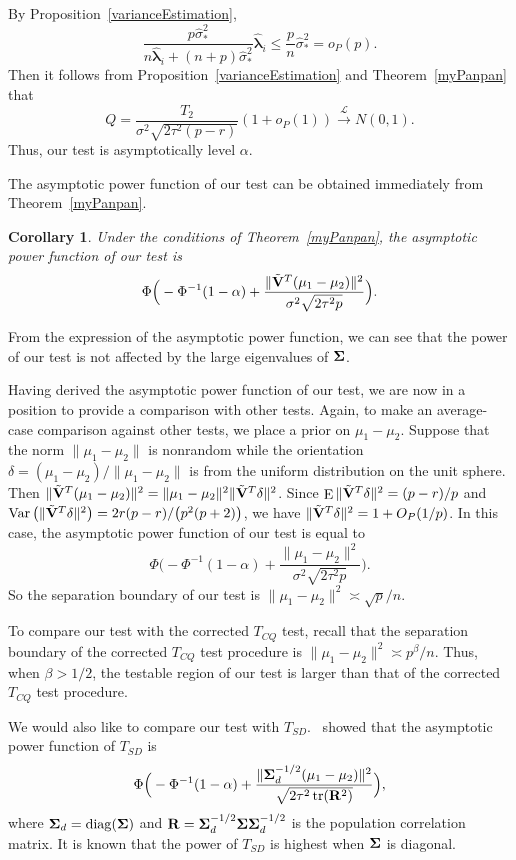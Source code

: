 \documentclass[review]{elsarticle}
\DeclareMathOperator{\mytr}{tr}
\DeclareMathOperator{\mydiag}{diag}
\DeclareMathOperator{\myE}{E}
\DeclareMathOperator{\myVar}{Var}
\newcommand{\bfsym}[1]{\ensuremath{\boldsymbol{#1}}}
\def\blambda {\bfsym {\lambda}}        \def\bLambda {\bfsym {\Lambda}}
\theoremstyle{plain}
\newtheorem{corollary}{\quad\quad Corollary}
\theoremstyle{definition}
\theoremstyle{remark}
\begin{document}
By Proposition~\ref{varianceEstimation},
$$
\frac{p\hat{\sigma}_*^2}{n\hat{\blambda}_i+(n+p)\hat{\sigma}_*^2}\hat{\blambda}_i\leq
\frac{p}{n}\hat{\sigma}_*^2
=o_P(p).
$$
Then it follows from Proposition~\ref{varianceEstimation} and Theorem~\ref{myPanpan} that
$$
Q=\frac{T_2}{\sigma^2\sqrt{2\tau^2 (p-r)}}(1+o_P(1))\xrightarrow{\mathcal{L}}N(0,1).
$$
Thus,
our test is asymptotically level $\alpha$.


The asymptotic power function of our test can be obtained immediately from Theorem~\ref{myPanpan}.
\begin{corollary}\label{testPowerh}
    Under the conditions of Theorem~\ref{myPanpan}, the asymptotic power function of our test is
    \begin{equation*}
        \Phi\Big(-\Phi^{-1}(1-\alpha)+\frac{\|\tilde{\mathbf{V}}^T(\mu_1-\mu_2)\|^2}{\sigma^2\sqrt{2\tau^2p}}\Big).
    \end{equation*}
\end{corollary}
From the expression of the asymptotic power function, we can see that the power of our test is not affected by the large eigenvalues of $\bSigma$.

Having derived the asymptotic power function of our test, we are now in a position to provide a comparison with other tests.
Again, to make an average-case comparison against other tests, we place a prior on $\mu_1-\mu_2$.
Suppose that the norm $\|\mu_1-\mu_2\|$ is nonrandom while the orientation $\delta=(\mu_1-\mu_2)/\|\mu_1-\mu_2\|$ is from the uniform distribution on the unit sphere.
Then $\|\tilde{\mathbf{V}}^T(\mu_1-\mu_2)\|^2=\|\mu_1-\mu_2\|^2 \|\tilde{\mathbf{V}}^T\delta\|^2$.
Since $\myE \|\tilde{\BV}^T\delta\|^2=(p-r)/p$ and $\myVar \big(\|\tilde{\BV}^T\delta\|^2\big) = 2r(p-r)/\big(p^2(p+2)\big)$, we have $\|\tilde{\mathbf{V}}^T\delta\|^2=1+O_P(1/p)$.
In this case, the asymptotic power function of our test is equal to
    \begin{equation*}
        \Phi\Big(-\Phi^{-1}(1-\alpha)+\frac{\|\mu_1-\mu_2\|^2}{\sigma^2\sqrt{2\tau^2p}}\Big).
    \end{equation*}
So the separation boundary of our test is $\|\mu_1-\mu_2\|^2\asymp \sqrt{p}/n$.

To compare our test with the corrected $T_{CQ}$ test,
recall that the separation boundary of the corrected $T_{CQ}$ test procedure is $\|\mu_1-\mu_2\|^2\asymp p^{\beta}/n$.
 Thus, when $\beta>1/2$, the testable region of our test is larger than that of the corrected $T_{CQ}$ test procedure.

 We would also like to compare our test with $T_{SD}$.~\cite{Srivastava2008A} showed that the asymptotic power function of $T_{SD}$ is
 $$
        \Phi\Big(-\Phi^{-1}(1-\alpha)+\frac{\|\bSigma_d^{-1/2}(\mu_1-\mu_2)\|^2}{\sqrt{2\tau^2\mytr(\BR^2)}}\Big),
 $$
 where $\bSigma_d=\mydiag(\bSigma)$ and $\BR=\bSigma_d^{-1/2} \bSigma \bSigma_d^{-1/2}$ is the population correlation matrix.
 It is known that the power of $T_{SD}$ is highest when $\bSigma$ is diagonal.
\end{document}
